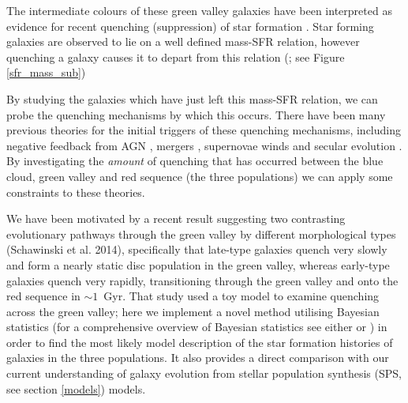 \documentclass[useAMS,usenatbib]{mn2e}
\begin{document}
The intermediate colours of these green valley galaxies have been interpreted as evidence for recent quenching (suppression) of star formation \citep{Salim07}. Star forming galaxies are observed to lie on a well defined mass-SFR relation, however quenching a galaxy causes it to depart from this relation (\citealt{Noeske07, Peng}; see Figure \ref{sfr_mass_sub})


By studying the galaxies which  have just left this mass-SFR relation, we can probe the quenching mechanisms by which this occurs. There have been many previous theories for the initial triggers of these quenching mechanisms, including negative feedback from AGN \citep{Sch07}, mergers \citep{Darg10a}, supernovae winds \citep{MFB12} and secular evolution \citep{Masters10, Masters11}. By investigating the \emph{amount} of quenching that has occurred between the blue cloud, green valley and red sequence (the three populations) we can apply some constraints to these theories. 

We have been motivated by a recent result suggesting two contrasting evolutionary pathways through the green valley by different morphological types (Schawinski et al. 2014), specifically that late-type galaxies quench very slowly and form a nearly static disc population in the green valley, whereas early-type galaxies quench very rapidly, transitioning through the green valley and onto the red sequence in $\sim 1$~Gyr. That study used a toy model to examine quenching across the green valley; here we implement a novel method utilising Bayesian statistics (for a comprehensive overview of Bayesian statistics see either \citealt{MacKay} or \citealt{Sivia}) in order to find the most likely model description of the star formation histories of galaxies in the three populations. It also provides a direct comparison with our current understanding of galaxy evolution from stellar population synthesis (SPS, see section \ref{models}) models. 
\end{document}
